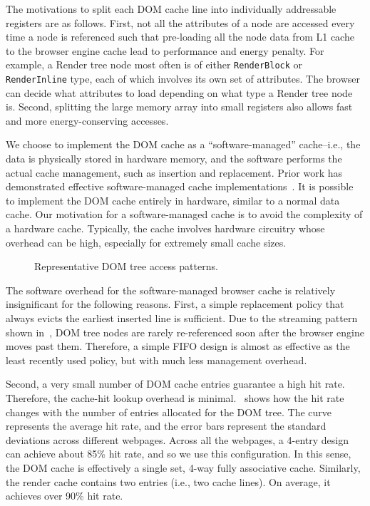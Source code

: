 The motivations to split each DOM cache line into individually addressable registers are as follows. First, not all the attributes of a node are accessed every time a node is referenced such that pre-loading all the node data from L1 cache to the browser engine cache lead to performance and energy penalty. For example, a Render tree node most often is of either \texttt{RenderBlock} or \texttt{RenderInline} type, each of which involves its own set of attributes. The browser can decide what attributes to load depending on what type a Render tree node is. Second, splitting the large memory array into small registers also allows fast and more energy-conserving accesses.

We choose to implement the DOM cache as a ``software-managed'' cache--i.e., the data is physically stored in hardware memory, and the software performs the actual cache management, such as insertion and replacement. Prior work has demonstrated effective software-managed cache implementations~\cite{Hallnor:2000:FAS:339647.339660}. It is possible to implement the DOM cache entirely in hardware, similar to a normal data cache. Our motivation for a software-managed cache is to avoid the complexity of a hardware cache. Typically, the cache involves hardware circuitry whose overhead can be high, especially for extremely small cache sizes.

\begin{figure}[t]
\centering
{}
\hspace*{15pt}
\caption{Representative DOM tree access patterns.}
\label{fig:data-acs}
\end{figure}

The software overhead for the software-managed browser cache is relatively insignificant for the following reasons. First, a simple replacement policy that always evicts the earliest inserted line is sufficient. Due to the streaming pattern shown in~, DOM tree nodes are rarely re-referenced soon after the browser engine moves past them. Therefore, a simple FIFO design is almost as effective as the least recently used policy, but with much less management overhead.

Second, a very small number of DOM cache entries guarantee a high hit rate. Therefore, the cache-hit lookup overhead is minimal.~ shows how the hit rate changes with the number of entries allocated for the DOM tree. The curve represents the average hit rate, and the error bars represent the standard deviations across different webpages. Across all the webpages, a 4-entry design can achieve about 85\% hit rate, and so we use this configuration. In this sense, the DOM cache is effectively a single set, 4-way fully associative cache. Similarly, the render cache contains two entries (i.e., two cache lines). On average, it achieves over 90\% hit rate.

